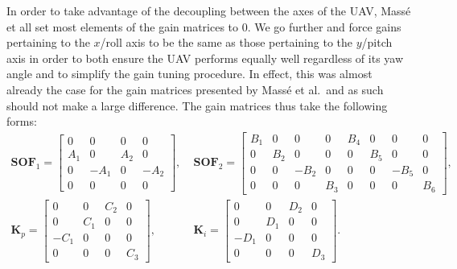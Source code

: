 \documentclass[a4paper,12pt]{article}
\begin{document}
        In order to take advantage of the decoupling between the axes of the UAV, Mass{\'e} et all set most elements of the gain matrices to 0. We go further and force gains pertaining to the \(x\)/roll axis to be the same as those pertaining to the \(y\)/pitch axis in order to both ensure the UAV performs equally well regardless of its yaw angle and to simplify the gain tuning procedure. In effect, this was almost already the case for the gain matrices presented by Mass{\'e} et al.\ and as such should not make a large difference. The gain matrices thus take the following forms:
        \begin{align}
            \mathbf{SOF}_1 =
            \begin{bmatrix}
                0   &  0   & 0   & 0    \\
                A_1 &  0   & A_2 & 0    \\
                0   & -A_1 & 0   & -A_2 \\
                0   &  0   & 0   & 0 
            \end{bmatrix},& \;
            \mathbf{SOF}_2 =
            \begin{bmatrix}
                B_1 & 0   &  0   & 0   & B_4 & 0   &  0   & 0 \\
                0   & B_2 &  0   & 0   & 0   & B_5 &  0   & 0 \\
                0   & 0   & -B_2 & 0   & 0   & 0   & -B_5 & 0 \\
                0   & 0   &  0   & B_3 & 0   & 0   &  0   & B_6 
            \end{bmatrix}, \\
            \mathbf{K}_p =
            \begin{bmatrix}
                0   & 0   & C_2 & 0 \\
                0   & C_1 & 0   & 0 \\
               -C_1 & 0   & 0   & 0 \\
                0   & 0   & 0   & C_3 
            \end{bmatrix},& \;
            \mathbf{K}_i =
            \begin{bmatrix}
                0   & 0   & D_2 & 0 \\
                0   & D_1 & 0   & 0 \\
               -D_1 & 0   & 0   & 0 \\
                0   & 0   & 0   & D_3 
            \end{bmatrix}.
        \end{align}
\end{document}
